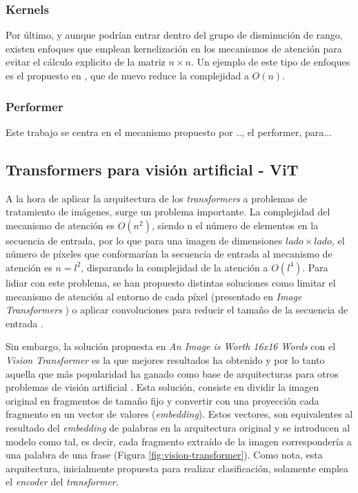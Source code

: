 \subsubsection{Kernels}
Por último, y aunque podrían entrar dentro del grupo de disminución de rango, existen enfoques que emplean kernelización en los mecanismos de atención para evitar el cálculo explicito de la matriz $n \times n$. Un ejemplo de este tipo de enfoques es el propuesto en \cite{kernel-transformer}, que de nuevo reduce la complejidad a $O(n)$.

\subsubsection{Performer}
Este trabajo se centra en el mecanismo propuesto por .., el performer, para...

\subsection{Transformers para visión artificial - ViT}
A la hora de aplicar la arquitectura de los \textit{transformers} a problemas de tratamiento de imágenes, surge un problema importante. La complejidad del mecanismo de atención es $O(n^{2})$, siendo n el número de elementos en la secuencia de entrada, por lo que para una imagen de dimensiones $lado \times lado$, el número de píxeles que conformarían la secuencia de entrada al mecanismo de atención es $n = l^2$, disparando la complejidad de la atención a $O(l^{4})$. Para lidiar con este problema, se han propuesto distintas soluciones como limitar el mecanismo de atención al entorno de cada píxel (presentado en \textit{Image Transformers} \cite{image_transformer}) o aplicar convoluciones para reducir el tamaño de la secuencia de entrada \cite{detrfacebookdetectiontransformers}. 

Sin embargo, la solución propuesta en \textit{An Image is Worth 16x16 Words} con el \textit{Vision Transformer} \cite{image16x16words} es la que mejores resultados ha obtenido y por lo tanto aquella que más popularidad ha ganado como base de arquitecturas para otros problemas de visión artificial \cite{visiontransformersDPT, bhat2020adabins, chen2021transunet, liu2021Swin}. Esta solución, consiste en dividir la imagen original en fragmentos de tamaño fijo y convertir con una proyección cada fragmento en un vector de valores (\textit{embedding}). Estos vectores, son equivalentes al resultado del \textit{embedding} de palabras en la arquitectura original y se introducen al modelo como tal, es decir, cada fragmento extraído de la imagen correspondería a una palabra de una frase (Figura \ref{fig:vision-transformer}). Como nota, esta arquitectura, inicialmente propuesta para realizar clasificación, solamente emplea el \textit{encoder} del \textit{transformer}.

